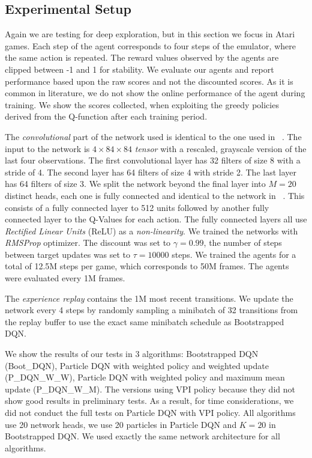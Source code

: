 \subsection{Experimental Setup}
Again we are testing for deep exploration, but in this section we focus in Atari games. Each step of the agent corresponds to four steps of the emulator, where the same action is repeated. The reward values observed by the agents are clipped between -1 and 1 for stability. We evaluate our agents and report performance based upon the raw scores and not the discounted scores. As it is common in literature, we do not show the online performance of the agent during training. We show the scores collected, when exploiting the greedy policies derived from the Q-function after each training period.\par
The \emph{convolutional} part of the network used is identical to the one used in ~\cite{DBLP:journals/corr/OsbandBPR16}. The input to the network is $4\times 84 \times 84$ \emph{tensor} with a rescaled, grayscale version of the last four observations. The first convolutional layer has 32 filters of size 8 with a stride of 4. The second layer has 64 filters of size 4 with stride 2. The last layer has 64 filters of size 3. We split the network beyond the final layer into $M = 20$ distinct heads, each one is fully connected and identical to the network in ~\cite{DBLP:journals/corr/OsbandBPR16}. This consists of a fully connected layer to 512 units followed by another fully connected layer to the Q-Values for each action. The fully connected layers all use \emph{Rectified Linear Units} (ReLU) as a \emph{non-linearity}.
We trained the networks with \emph{RMSProp} optimizer. The discount was set to $\gamma = 0.99$, the number of steps between target updates was set to $\tau= 10000$ steps. We trained the agents for a total of 12.5M steps per game, which corresponds to 50M frames. The agents were evaluated every 1M frames. \par
The \emph{experience replay} contains the 1M most recent transitions. We update the network every 4 steps by randomly sampling a minibatch of 32 transitions from the replay buffer to use the exact same minibatch schedule as Bootstrapped DQN. \par
We show the results of our tests in 3 algorithms: Bootstrapped DQN (Boot\_DQN), Particle DQN with weighted policy and weighted update (P\_DQN\_W\_W), Particle DQN with weighted policy and maximum mean update (P\_DQN\_W\_M). The versions using VPI policy because they did not show good results in preliminary tests. As a result, for time considerations, we did not conduct the full tests on Particle DQN with VPI policy. All algorithms use 20 network heads, \ie we use 20 particles in Particle DQN and $K=20$ in Bootstrapped DQN. We used exactly the same network architecture for all algorithms.
